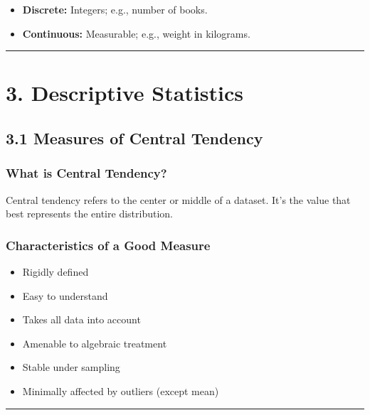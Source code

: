 \documentclass[
  letterpaper,
  DIV=11,
  numbers=noendperiod]{scrreprt}
\providecommand{\tightlist}{%
  \setlength{\itemsep}{0pt}\setlength{\parskip}{0pt}}
\begin{document}
\begin{itemize}
\tightlist
\item
  \textbf{Discrete:} Integers; e.g., number of books.
\item
  \textbf{Continuous:} Measurable; e.g., weight in kilograms.
\end{itemize}

\begin{center}\rule{0.5\linewidth}{0.5pt}\end{center}

\section{3. Descriptive Statistics}\label{descriptive-statistics}

\subsection{3.1 Measures of Central
Tendency}\label{measures-of-central-tendency}

\subsubsection{What is Central
Tendency?}\label{what-is-central-tendency}

Central tendency refers to the center or middle of a dataset. It's the
value that best represents the entire distribution.

\subsubsection{Characteristics of a Good
Measure}\label{characteristics-of-a-good-measure}

\begin{itemize}
\tightlist
\item
  Rigidly defined
\item
  Easy to understand
\item
  Takes all data into account
\item
  Amenable to algebraic treatment
\item
  Stable under sampling
\item
  Minimally affected by outliers (except mean)
\end{itemize}

\begin{center}\rule{0.5\linewidth}{0.5pt}\end{center}
\end{document}
